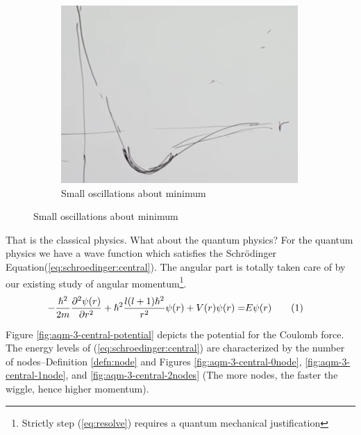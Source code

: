 \documentclass[]{article}
\newcommand\numberthis{\addtocounter{equation}{1}\tag{\theequation}}
\begin{document}
\begin{figure}[H]
\begin{subfigure}[t]{0.3\textwidth}
	\end{subfigure}
	\begin{subfigure}[t]{0.3\textwidth}
		\caption{Small oscillations about minimum}\label{fig:aqm-3-central-osc}
		\includegraphics[width=\textwidth]{aqm-3-central-osc}
	\end{subfigure}
\end{figure}

That is the classical physics. What about the quantum physics? For the quantum physics we have a wave function which satisfies the Schr\"odinger Equation(\ref{eq:schroedinger:central}). The angular part is totally taken care of by our existing study of angular momentum\footnote{Strictly step (\ref{eq:resolve}) requires a quantum mechanical justification}.
\begin{align*}
	-\frac{\hslash^2}{2m}\frac{\partial^2 \psi(r)}{\partial r^2} + \hslash^2 \frac{l(l+1)\hslash^2}{r^2}\psi(r)+V(r)\psi(r) =& E\psi(r)\numberthis \label{eq:schroedinger:central}
\end{align*}

Figure \ref{fig:aqm-3-central-potential} depicts the potential for the Coulomb force. The energy levels of (\ref{eq:schroedinger:central}) are characterized by the number of nodes--Definition \ref{defn:node} and Figures \ref{fig:aqm-3-central-0node}, \ref{fig:aqm-3-central-1node}, and \ref{fig:aqm-3-central-2nodes} (The more nodes, the faster the wiggle, hence higher momentum).
\end{document}
